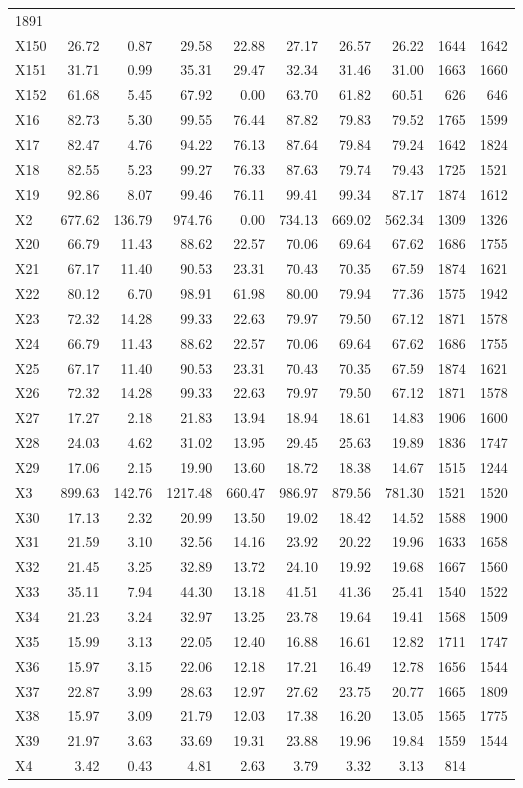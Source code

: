 \documentclass[
]{article}
\begin{document}
\begin{longtable}[]{@{}lrrrrrrrrr@{}}
1891\tabularnewline
X150 & 26.72 & 0.87 & 29.58 & 22.88 & 27.17 & 26.57 & 26.22 & 1644 &
1642\tabularnewline
X151 & 31.71 & 0.99 & 35.31 & 29.47 & 32.34 & 31.46 & 31.00 & 1663 &
1660\tabularnewline
X152 & 61.68 & 5.45 & 67.92 & 0.00 & 63.70 & 61.82 & 60.51 & 626 &
646\tabularnewline
X16 & 82.73 & 5.30 & 99.55 & 76.44 & 87.82 & 79.83 & 79.52 & 1765 &
1599\tabularnewline
X17 & 82.47 & 4.76 & 94.22 & 76.13 & 87.64 & 79.84 & 79.24 & 1642 &
1824\tabularnewline
X18 & 82.55 & 5.23 & 99.27 & 76.33 & 87.63 & 79.74 & 79.43 & 1725 &
1521\tabularnewline
X19 & 92.86 & 8.07 & 99.46 & 76.11 & 99.41 & 99.34 & 87.17 & 1874 &
1612\tabularnewline
X2 & 677.62 & 136.79 & 974.76 & 0.00 & 734.13 & 669.02 & 562.34 & 1309 &
1326\tabularnewline
X20 & 66.79 & 11.43 & 88.62 & 22.57 & 70.06 & 69.64 & 67.62 & 1686 &
1755\tabularnewline
X21 & 67.17 & 11.40 & 90.53 & 23.31 & 70.43 & 70.35 & 67.59 & 1874 &
1621\tabularnewline
X22 & 80.12 & 6.70 & 98.91 & 61.98 & 80.00 & 79.94 & 77.36 & 1575 &
1942\tabularnewline
X23 & 72.32 & 14.28 & 99.33 & 22.63 & 79.97 & 79.50 & 67.12 & 1871 &
1578\tabularnewline
X24 & 66.79 & 11.43 & 88.62 & 22.57 & 70.06 & 69.64 & 67.62 & 1686 &
1755\tabularnewline
X25 & 67.17 & 11.40 & 90.53 & 23.31 & 70.43 & 70.35 & 67.59 & 1874 &
1621\tabularnewline
X26 & 72.32 & 14.28 & 99.33 & 22.63 & 79.97 & 79.50 & 67.12 & 1871 &
1578\tabularnewline
X27 & 17.27 & 2.18 & 21.83 & 13.94 & 18.94 & 18.61 & 14.83 & 1906 &
1600\tabularnewline
X28 & 24.03 & 4.62 & 31.02 & 13.95 & 29.45 & 25.63 & 19.89 & 1836 &
1747\tabularnewline
X29 & 17.06 & 2.15 & 19.90 & 13.60 & 18.72 & 18.38 & 14.67 & 1515 &
1244\tabularnewline
X3 & 899.63 & 142.76 & 1217.48 & 660.47 & 986.97 & 879.56 & 781.30 &
1521 & 1520\tabularnewline
X30 & 17.13 & 2.32 & 20.99 & 13.50 & 19.02 & 18.42 & 14.52 & 1588 &
1900\tabularnewline
X31 & 21.59 & 3.10 & 32.56 & 14.16 & 23.92 & 20.22 & 19.96 & 1633 &
1658\tabularnewline
X32 & 21.45 & 3.25 & 32.89 & 13.72 & 24.10 & 19.92 & 19.68 & 1667 &
1560\tabularnewline
X33 & 35.11 & 7.94 & 44.30 & 13.18 & 41.51 & 41.36 & 25.41 & 1540 &
1522\tabularnewline
X34 & 21.23 & 3.24 & 32.97 & 13.25 & 23.78 & 19.64 & 19.41 & 1568 &
1509\tabularnewline
X35 & 15.99 & 3.13 & 22.05 & 12.40 & 16.88 & 16.61 & 12.82 & 1711 &
1747\tabularnewline
X36 & 15.97 & 3.15 & 22.06 & 12.18 & 17.21 & 16.49 & 12.78 & 1656 &
1544\tabularnewline
X37 & 22.87 & 3.99 & 28.63 & 12.97 & 27.62 & 23.75 & 20.77 & 1665 &
1809\tabularnewline
X38 & 15.97 & 3.09 & 21.79 & 12.03 & 17.38 & 16.20 & 13.05 & 1565 &
1775\tabularnewline
X39 & 21.97 & 3.63 & 33.69 & 19.31 & 23.88 & 19.96 & 19.84 & 1559 &
1544\tabularnewline
X4 & 3.42 & 0.43 & 4.81 & 2.63 & 3.79 & 3.32 & 3.13 & 814 &

\end{longtable}
\end{document}
